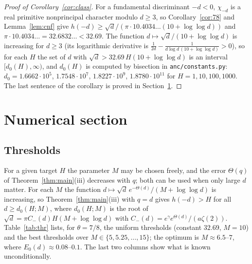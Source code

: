 \documentclass[11pt]{article}
\theoremstyle{definition}
\theoremstyle{remark}
\numberwithin{equation}{section}
\begin{document}
\begin{proof}[Proof of Corollary~\ref{cor:class}]
For a fundamental discriminant $-d<0$, $\chi_{-d}$ is a real primitive nonprincipal character modulo $d\ge3$, so Corollary~\ref{cor:78} and Lemma~\ref{lem:cnf} give $h(-d)\ge\sqrt d/(\pi\cdot10.4034\ldots(10+\log\log d))$ and $\pi\cdot10.4034\ldots=32.6832\ldots<32.69$. The function $d\mapsto\sqrt d/(10+\log\log d)$ is increasing for $d\ge3$ (its logarithmic derivative is $\frac1{2d}-\frac1{d\log d\,(10+\log\log d)}>0$), so for each $H$ the set of $d$ with $\sqrt d>32.69\,H(10+\log\log d)$ is an interval $[d_0(H),\infty)$, and $d_0(H)$ is computed by bisection in \texttt{anc/constants.py}: $d_0=1.6662\cdot10^5$, $1.7548\cdot10^7$, $1.8227\cdot10^9$, $1.8780\cdot10^{11}$ for $H=1,10,100,1000$. The last sentence of the corollary is proved in Section~\ref{sec:numerics}.
\end{proof}

\section{Numerical section}\label{sec:numerics}

\subsection{Thresholds}
For a given target $H$ the parameter $M$ may be chosen freely, and the error $\Theta(q)$ of Theorem~\ref{thm:main}(iii) decreases with $q$; both can be used when only large $d$ matter. For each $M$ the function $d\mapsto\sqrt d\,e^{-\Theta(d)}/(M+\log\log d)$ is increasing, so Theorem~\ref{thm:main}(iii) with $q=d$ gives $h(-d)>H$ for all $d\ge d_0(H;M)$, where $d_0(H;M)$ is the root of $\sqrt d=\pi C_-(d)H(M+\log\log d)$ with $C_-(d)=e^{\gamma}e^{\Theta(d)}/(a\zeta(2))$. Table~\ref{tab:thr} lists, for $\theta=7/8$, the uniform thresholds (constant $32.69$, $M=10$) and the best thresholds over $M\in\{5,5.25,\ldots,15\}$; the optimum is $M\approx6.5$--$7$, where $E_0(d)\approx0.08$--$0.1$. The last two columns show what is known unconditionally.
\end{document}
